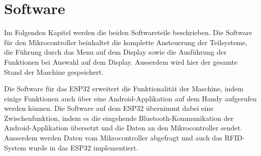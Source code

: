 \newpage
\section{Software}
\label{sec:Software}

Im Folgenden Kapitel werden die beiden Softwareteile beschrieben. Die Software für den Mikrocontroller beinhaltet die komplette Ansteuerung der Teilsysteme, die Führung durch das Menu auf dem Display sowie die Ausführung der Funktionen bei Auswahl auf dem Display. Ausserdem wird hier der gesamte Stand der Maschine gespeichert.

Die Software für das ESP32 erweitert die Funktionalität der Maschine, indem einige Funktionen auch über eine Android-Applikation auf dem Handy aufgerufen werden können. Die Software auf dem ESP32 übernimmt dabei eine Zwischenfunktion, indem es die eingehende Bluetooth-Kommunikation der Android-Applikation übersetzt und die Daten an den Mikrocontroller sendet. Ausserdem werden Daten vom Mikrocontroller abgefragt und auch das RFID-System wurde in das ESP32 implementiert.